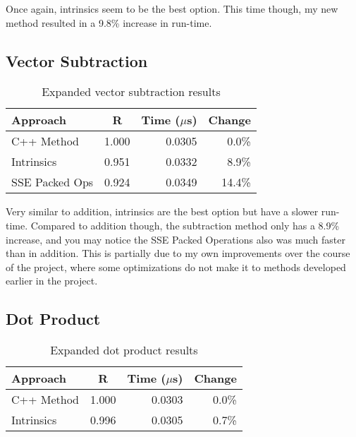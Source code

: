 \documentclass{article}
\begin{document}
Once again, intrinsics seem to be the best option. This time though, my new method resulted in a 9.8\% increase in run-time.

\vspace{5mm}

\subsection{Vector Subtraction}

\begin{table}[ht!]
\centering
\begin{tabular}{l|c|r|r}
    Approach        &   R   &   Time ($\mu$s)   &   Change \\
\hline
C++ Method          &  1.000  &  0.0305  &   0.0\%  \\
Intrinsics          &  0.951  &  0.0332  &   8.9\%  \\
SSE Packed Ops      &  0.924  &  0.0349  &  14.4\%  \\
\end{tabular}
\caption{Expanded vector subtraction results}
\end{table}

Very similar to addition, intrinsics are the best option but have a slower run-time. Compared to addition though, the subtraction method only has a 8.9\% increase, and you may notice the SSE Packed Operations also was much faster than in addition. This is partially due to my own improvements over the course of the project, where some optimizations do not make it to methods developed earlier in the project.

\vspace{5mm}

\subsection{Dot Product}

\begin{table}[ht!]
\centering
\begin{tabular}{l|c|r|r}
    Approach        &   R   &   Time ($\mu$s)   &   Change \\
\hline
C++ Method          &  1.000  &  0.0303  &   0.0\%  \\
Intrinsics          &  0.996  &  0.0305  &   0.7\%  \\
\end{tabular}
\caption{Expanded dot product results}
\end{table}
\end{document}
